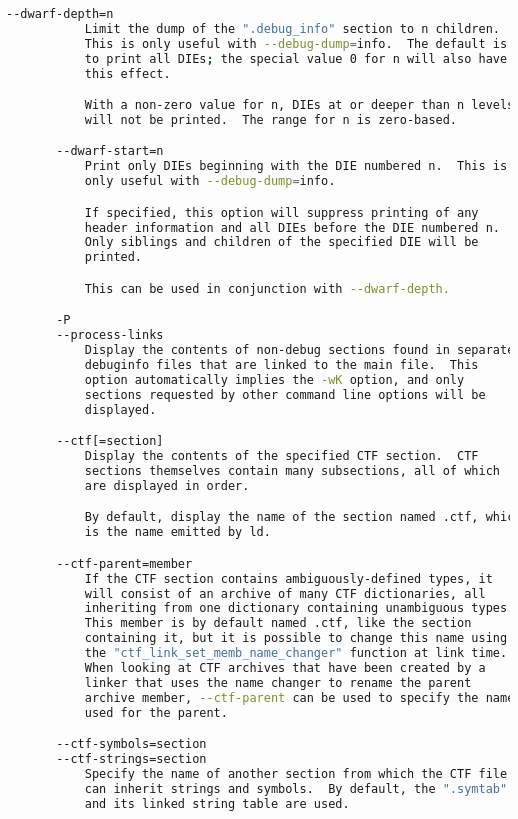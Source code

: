 {{\begin{lstlisting}[language=bash]
       --dwarf-depth=n
           Limit the dump of the ".debug_info" section to n children.
           This is only useful with --debug-dump=info.  The default is
           to print all DIEs; the special value 0 for n will also have
           this effect.

           With a non-zero value for n, DIEs at or deeper than n levels
           will not be printed.  The range for n is zero-based.

       --dwarf-start=n
           Print only DIEs beginning with the DIE numbered n.  This is
           only useful with --debug-dump=info.

           If specified, this option will suppress printing of any
           header information and all DIEs before the DIE numbered n.
           Only siblings and children of the specified DIE will be
           printed.

           This can be used in conjunction with --dwarf-depth.

       -P
       --process-links
           Display the contents of non-debug sections found in separate
           debuginfo files that are linked to the main file.  This
           option automatically implies the -wK option, and only
           sections requested by other command line options will be
           displayed.

       --ctf[=section]
           Display the contents of the specified CTF section.  CTF
           sections themselves contain many subsections, all of which
           are displayed in order.

           By default, display the name of the section named .ctf, which
           is the name emitted by ld.

       --ctf-parent=member
           If the CTF section contains ambiguously-defined types, it
           will consist of an archive of many CTF dictionaries, all
           inheriting from one dictionary containing unambiguous types.
           This member is by default named .ctf, like the section
           containing it, but it is possible to change this name using
           the "ctf_link_set_memb_name_changer" function at link time.
           When looking at CTF archives that have been created by a
           linker that uses the name changer to rename the parent
           archive member, --ctf-parent can be used to specify the name
           used for the parent.

       --ctf-symbols=section
       --ctf-strings=section
           Specify the name of another section from which the CTF file
           can inherit strings and symbols.  By default, the ".symtab"
           and its linked string table are used.


\end{lstlisting}}}
